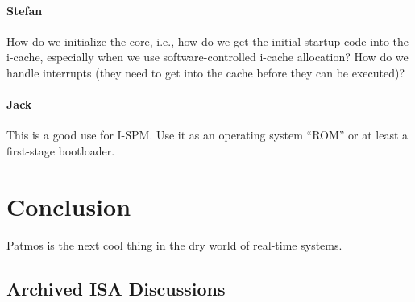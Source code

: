 \documentclass{IEEEtran}
\newcommand{\comment}[3]{\paragraph*{\textbf{#1}}{\color{#3}#2}}
\newcommand{\stefan}[1]{\comment{Stefan}{#1}{RoyalPurple}}
\newcommand{\jack}[1]{\comment{Jack}{#1}{Magenta}}
\begin{document}
%
%
%
%
%
%
%
%


\stefan{How do we initialize the core, i.e., how do we get the initial startup code into the i-cache, especially when
we use software-controlled i-cache allocation? How do we handle interrupts (they need to get into the cache before they can be executed)?}

\jack{This is a good use for I-SPM. Use it as an operating system ``ROM''
or at least a first-stage bootloader.}


\section{Conclusion}
\label{sec:conclusion}

Patmos is the next cool thing in the dry world of real-time systems.






\appendix


\subsection{Archived ISA Discussions}
\end{document}
